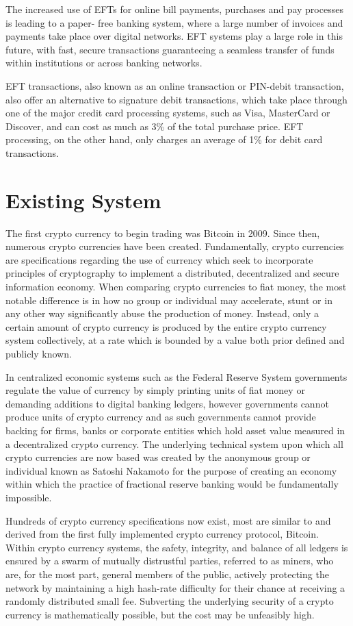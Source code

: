 The increased use of EFTs for online bill payments, purchases and pay processes is leading to a paper-
free banking system, where a large number of invoices and payments take place over digital networks. 
EFT systems play a large role in this future, with fast, secure transactions guaranteeing a seamless transfer 
of funds within institutions or across banking networks.

EFT transactions, also known as an online transaction or PIN-debit transaction, also offer an alternative 
to signature debit transactions, which take place through one of the major credit card processing systems, 
such as Visa, MasterCard or Discover, and can cost as much as 3\% of the total purchase price. EFT 
processing, on the other hand, only charges an average of 1\% for debit card transactions.

\chapter{Existing System}
The first crypto currency to begin trading was Bitcoin in 2009. Since then, numerous crypto 
currencies have been created. Fundamentally, crypto currencies are specifications regarding the 
use of currency which seek to incorporate principles of cryptography to implement a distributed, 
decentralized and secure information economy. When comparing crypto currencies to fiat 
money, the most notable difference is in how no group or individual may accelerate, stunt or in 
any other way significantly abuse the production of money. Instead, only a certain amount of 
crypto currency is produced by the entire crypto currency system collectively, at a rate which is 
bounded by a value both prior defined and publicly known.

In centralized economic systems such as the Federal Reserve System governments regulate 
the value of currency by simply printing units of fiat money or demanding additions to digital 
banking ledgers, however governments cannot produce units of crypto currency and as such 
governments cannot provide backing for firms, banks or corporate entities which hold asset 
value measured in a decentralized crypto currency. The underlying technical system upon 
which all crypto currencies are now based was created by the anonymous group or individual 
known as Satoshi Nakamoto for the purpose of creating an economy within which the practice 
of fractional reserve banking would be fundamentally impossible.

Hundreds of crypto currency specifications now exist, most are similar to and derived from the 
first fully implemented crypto currency protocol, Bitcoin. Within crypto currency systems,
the safety, integrity, and balance of all ledgers is ensured by a swarm of mutually distrustful
parties, referred to as miners, who are, for the most part, general members of the public, actively
protecting the network by maintaining a high hash-rate difficulty for their chance at receiving
a randomly distributed small fee. Subverting the underlying security of a crypto currency is 
mathematically possible, but the cost may be unfeasibly high.

